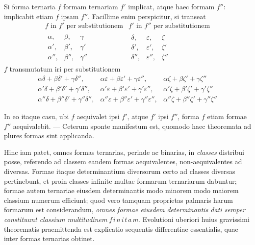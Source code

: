 Si forma ternaria $f$ formam ternariam $f'$ implicat, atque haec formam $f''$:
implicabit etiam $f$ ipsam $f''$. Facillime enim perspicitur, si transeat
\[
\begin{array}{c|c}
f\text{ in }f'\text{ per substitutionem} & f'\text{ in }f''\text{ per substitutionem} \\[2pt]
\begin{array}{ccc}
\alpha, & \beta, & \gamma \\
\alpha', & \beta', & \gamma' \\
\alpha'', & \beta'', & \gamma''
\end{array}
&
\begin{array}{ccc}
\delta, & \varepsilon, & \zeta \\
\delta', & \varepsilon', & \zeta' \\
\delta'', & \varepsilon'', & \zeta''
\end{array}
\end{array}
\]
$f$ transmutatum iri per substitutionem
\[
\begin{array}{ccc}
\alpha\delta+\beta\delta'+\gamma\delta'', & \alpha\varepsilon+\beta\varepsilon'+\gamma\varepsilon'', & \alpha\zeta+\beta\zeta'+\gamma\zeta'' \\
\alpha'\delta+\beta'\delta'+\gamma'\delta'', & \alpha'\varepsilon+\beta'\varepsilon'+\gamma'\varepsilon'', & \alpha'\zeta+\beta'\zeta'+\gamma'\zeta'' \\
\alpha''\delta+\beta''\delta'+\gamma''\delta'', & \alpha''\varepsilon+\beta''\varepsilon'+\gamma''\varepsilon'', & \alpha''\zeta+\beta''\zeta'+\gamma''\zeta''
\end{array}
\]

In eo itaque casu, ubi $f$ aequivalet ipsi $f'$, atque $f'$ ipsi $f''$, forma $f$ etiam
formae $f''$ aequivalebit. --- Ceterum sponte manifestum est, quomodo haec theoremata
ad plures formas sint applicanda.

Hinc iam patet, omnes formas ternarias, perinde ac binarias, in \textit{classes}
distribui posse, referendo ad classem eandem formas aequivalentes, non-aequivalentes
ad diversas. Formae itaque determinantium diversorum certo ad classes
diversas pertinebunt, et proin classes infinite multae formarum ternariarum dabuntur;
formae autem ternariae eiusdem determinantis modo minorem modo maiorem
classium numerum efficiunt; quod vero tamquam proprietas palmaris harum
formarum est considerandum, \textit{omnes formae eiusdem determinantis dati semper constituunt
classium multitudinem f\,i\,n\,i\,t\,a\,m.} Evolutioni uberiori huius gravissimi theorematis
praemittenda est explicatio sequentis differentiae essentialis, quae inter
formas ternarias obtinet.

